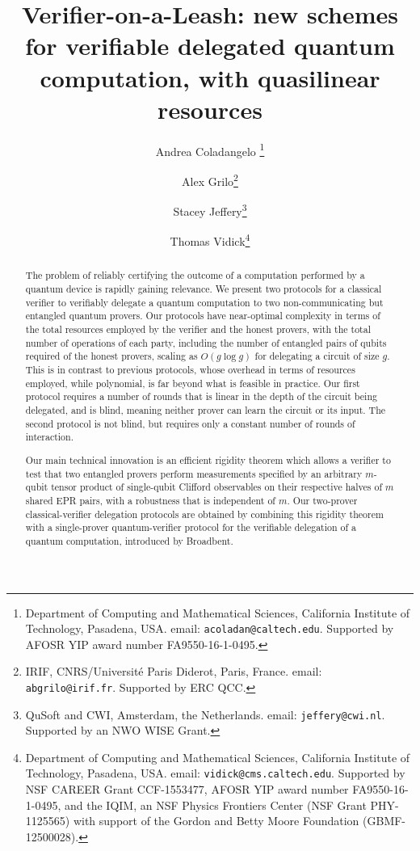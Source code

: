 \documentclass[11pt]{article}
\theoremstyle{remark}
\theoremstyle{definition}
\begin{document}
\title{Verifier-on-a-Leash: new schemes for verifiable delegated quantum computation, with quasilinear resources}

\author{Andrea Coladangelo \thanks{Department of Computing and Mathematical Sciences, California Institute of Technology, Pasadena, USA. email: \texttt{acoladan@caltech.edu}. Supported by AFOSR YIP award number FA9550-16-1-0495.}
  \and Alex Grilo\thanks{IRIF, CNRS/Universit\'e Paris Diderot, Paris, France. email: \texttt{abgrilo@irif.fr}. Supported by ERC QCC.}
  \and Stacey Jeffery\thanks{QuSoft and CWI, Amsterdam, the Netherlands. email: \texttt{jeffery@cwi.nl}. Supported by an NWO WISE Grant.}
  \and Thomas Vidick\thanks{Department of Computing and Mathematical Sciences,
    California Institute of Technology, Pasadena, USA. email:
    \texttt{vidick@cms.caltech.edu}. Supported by NSF CAREER Grant CCF-1553477, AFOSR YIP award number FA9550-16-1-0495, and the IQIM, an NSF Physics Frontiers Center (NSF Grant PHY-1125565) with support of the Gordon and Betty Moore Foundation (GBMF-12500028).}}


\date{}
\maketitle

\begin{abstract}
The problem of reliably certifying the outcome of a computation performed by a quantum device is rapidly gaining relevance. We present two protocols for a classical verifier to verifiably delegate a quantum computation to two non-communicating but entangled quantum provers. Our protocols have near-optimal complexity in terms of the total resources employed by the verifier and the honest provers, with the total number of operations of each party, including the number of entangled pairs of qubits required of the honest provers, scaling as $O(g\log g)$ for delegating a circuit of size $g$. This is in contrast to previous protocols, whose overhead in terms of resources employed, while polynomial, is
far beyond what is feasible in practice. 
Our first protocol requires a number of rounds that is linear in the depth of the circuit being delegated, and is blind, meaning neither prover can learn the circuit or its input. The second protocol is not blind, but requires only a constant number of rounds of interaction. 

Our main technical innovation is an efficient rigidity theorem which allows a verifier to test that two entangled provers perform measurements specified by an arbitrary $m$-qubit tensor product of single-qubit Clifford observables on their respective halves of $m$ shared EPR pairs, with a robustness that is independent of $m$. Our two-prover classical-verifier delegation protocols are obtained by combining this rigidity theorem with a single-prover quantum-verifier protocol for the verifiable delegation of a quantum computation, introduced by Broadbent.
\end{abstract}
\end{document}
